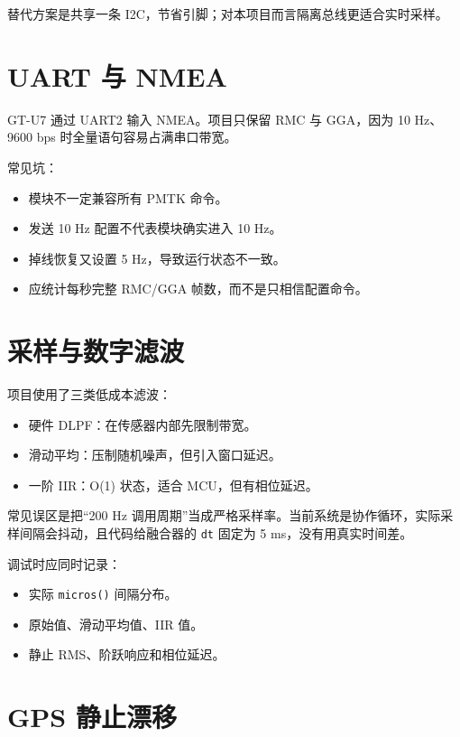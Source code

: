 \documentclass[
  UTF8,11pt,a4paper]{ctexart}
\newcommand{\passthrough}[1]{#1}
\providecommand{\tightlist}{%
  \setlength{\itemsep}{0pt}\setlength{\parskip}{0pt}}
\begin{document}
替代方案是共享一条 I2C，节省引脚；对本项目而言隔离总线更适合实时采样。

\section{UART 与 NMEA}\label{uart-ux4e0e-nmea}

GT-U7 通过 UART2 输入 NMEA。项目只保留 RMC 与 GGA，因为 10 Hz、9600 bps
时全量语句容易占满串口带宽。

常见坑：

\begin{itemize}
\tightlist
\item
  模块不一定兼容所有 PMTK 命令。
\item
  发送 10 Hz 配置不代表模块确实进入 10 Hz。
\item
  掉线恢复又设置 5 Hz，导致运行状态不一致。
\item
  应统计每秒完整 RMC/GGA 帧数，而不是只相信配置命令。
\end{itemize}

\section{采样与数字滤波}\label{ux91c7ux6837ux4e0eux6570ux5b57ux6ee4ux6ce2}

项目使用了三类低成本滤波：

\begin{itemize}
\tightlist
\item
  硬件 DLPF：在传感器内部先限制带宽。
\item
  滑动平均：压制随机噪声，但引入窗口延迟。
\item
  一阶 IIR：O(1) 状态，适合 MCU，但有相位延迟。
\end{itemize}

常见误区是把``200 Hz
调用周期''当成严格采样率。当前系统是协作循环，实际采样间隔会抖动，且代码给融合器的
\passthrough{\lstinline!dt!} 固定为 5 ms，没有用真实时间差。

调试时应同时记录：

\begin{itemize}
\tightlist
\item
  实际 \passthrough{\lstinline!micros()!} 间隔分布。
\item
  原始值、滑动平均值、IIR 值。
\item
  静止 RMS、阶跃响应和相位延迟。
\end{itemize}

\section{GPS 静止漂移}\label{gps-ux9759ux6b62ux6f02ux79fb}
\end{document}
